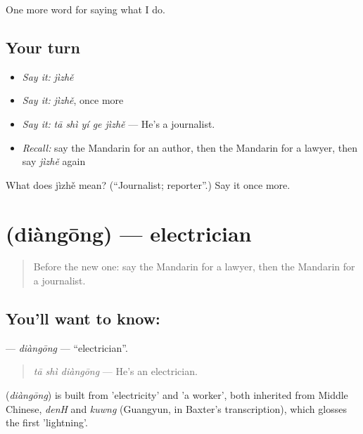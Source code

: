 \begin{grammarlens}[title={What you've built}]
One more word for saying what I do.
\end{grammarlens}

\subsection*{Your turn}
\begin{itemize}
\raggedright
  \item \emph{Say it:} \emph{jìzhě}
  \item \emph{Say it:} \emph{jìzhě}, once more
  \item \emph{Say it:} \emph{tā shì yí ge jìzhě} — He's a journalist.
  \item \emph{Recall:} say the Mandarin for an author, then the Mandarin for a lawyer, then say \emph{jìzhě} again
\end{itemize}

\begin{tcolorbox}[breakable,colback=teal!4,colframe=teal!35!black,title={Before you move on}]
What does jìzhě mean? (\textquotedblleft{}Journalist; reporter\textquotedblright{}.) Say it once more.
\end{tcolorbox}
\section[\texorpdfstring{\zh{电工} (diàngōng)}{电工 (diàngōng)}]{ (diàngōng) — electrician}

\label{lesson:ZH-C259-diangong}



\begin{quote}
Before the new one: say the Mandarin for a lawyer, then the Mandarin for a journalist.
\end{quote}

\subsection*{You'll want to know: }
\textbf{} — \emph{diàngōng} — \textquotedblleft{}electrician\textquotedblright{}.

\begin{quote}
\textbf{} \emph{tā shì diàngōng} — He's an electrician.
\end{quote}

\begin{cousinweb}
\textbf{} (\emph{diàngōng}) is built from  'electricity' and  'a worker', both inherited from Middle Chinese, \emph{denH} and \emph{kuwng} (Guangyun, in Baxter's transcription), which glosses the first 'lightning'.
\end{cousinweb}

